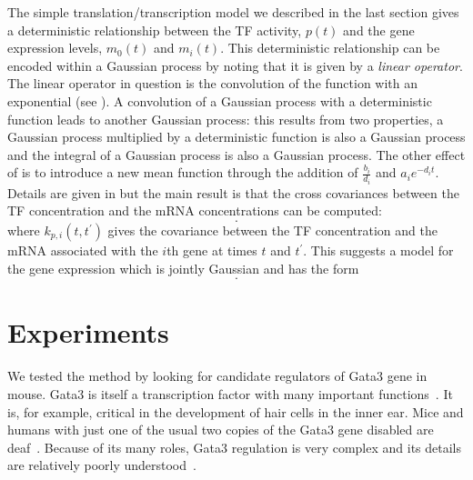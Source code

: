 \documentclass{article}
\begin{document}
The simple translation/transcription model we described in the last
section gives a deterministic relationship between the TF activity,
$p(t)$ and the gene expression levels, $m_0(t)$ and $m_i(t)$. This
deterministic relationship can be encoded within a Gaussian process by
noting that it is given by a \emph{linear operator}. The linear
operator in question is the convolution of the function with an
exponential (see ). A convolution of a
Gaussian process with a deterministic function leads to another
Gaussian process: this results from two properties, a Gaussian process
multiplied by a deterministic function is also a Gaussian process and
the integral of a Gaussian process is also a Gaussian process. The
other effect of  is to introduce a new mean
function through the addition of $\frac{b_i}{d_i}$ and $a_i e^{-d_i
  t}$. Details are given in
\cite{Lawrence:transcriptionalGP06,Gao:latent08,Honkela:modelbased10}
but the
main result is that the cross covariances between the TF concentration
and the mRNA concentrations can be computed:
\begin{equation}
  .
\end{equation}
where $k_{p,i}(t, t^\prime)$ gives the covariance between the TF
concentration and the mRNA associated with the $i$th gene at times $t$
and $t^\prime$. This suggests a model for the gene expression which is
jointly Gaussian and has the form
\begin{equation}
  .
\end{equation}

\section{Experiments}

We tested the method by looking for candidate regulators of Gata3 gene
in mouse.  Gata3 is itself a transcription factor with many important
functions~\cite{Chou2010}.  It is, for example, critical in the
development of hair cells in the inner ear.  Mice and humans with just
one of the usual two copies of the Gata3 gene disabled are
deaf~\cite{Esch2000}.  Because of its many roles, Gata3 regulation is
very complex and its details are relatively poorly
understood~\cite{Burch2005}.
\end{document}
